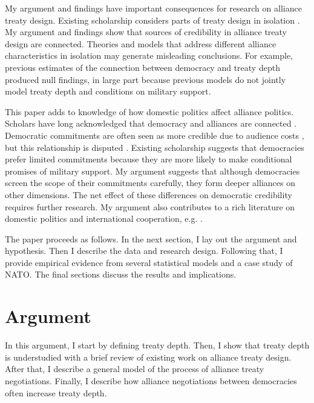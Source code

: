 \documentclass[12pt]{article}
\begin{document}
My argument and findings have important consequences for research on alliance treaty design. 
Existing scholarship considers parts of treaty design in isolation \citep{Benson2012, Mattes2012, Chibaetal2015}. 
My argument and findings show that sources of credibility in alliance treaty design are connected. 
Theories and models that address different alliance characteristics in isolation may generate misleading conclusions. 
For example, previous estimates of the connection between democracy and treaty depth produced null findings, in large part because previous models do not jointly model treaty depth and conditions on military support. 


This paper adds to knowledge of how domestic politics affect alliance politics. 
Scholars have long acknowledged that democracy and alliances are connected \citep{LaiReiter2000, GiblerWolford2006, Warren2016, McManusYarhi-Milo2017}. 
Democratic commitments are often seen as more credible due to audience costs \citep{Gaubatz1996, DigiuseppePoast2016}, but this relationship is disputed \citep{GartzkeGleditsch2004}. 
Existing scholarship suggests that democracies prefer limited commitments \citep{Mattes2012, Chibaetal2015} because they are more likely to make conditional promises of military support. 
My argument suggests that although democracies screen the scope of their commitments carefully, they form deeper alliances on other dimensions.  
The net effect of these differences on democratic credibility requires further research. 
My argument also contributes to a rich literature on domestic politics and international cooperation, e.g. \citep{DownesRocke1995, Fearon1998, Leeds1999, MattesRodriguez2014}. 


The paper proceeds as follows. 
In the next section, I lay out the argument and hypothesis. 
Then I describe the data and research design. 
Following that, I provide empirical evidence from several statistical models and a case study of NATO. 
The final sections discuss the results and implications. 


\section{Argument}


In this argument, I start by defining treaty depth. 
Then, I show that treaty depth is understudied with a brief review of existing work on alliance treaty design. 
After that, I describe a general model of the process of alliance treaty negotiations. 
Finally, I describe how alliance negotiations between democracies often increase treaty depth. 
\end{document}
